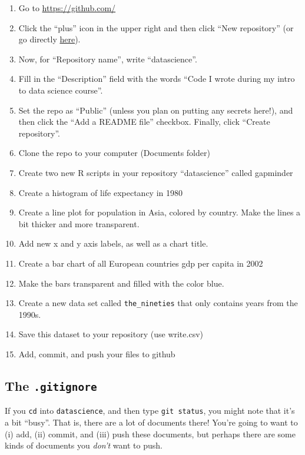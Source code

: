 \documentclass[
]{book}
\begin{document}
\begin{enumerate}
\def\labelenumi{\arabic{enumi})}
\item
  Go to \url{https://github.com/}
\item
  Click the ``plus'' icon in the upper right and then click ``New repository'' (or go directly \href{https://github.com/new}{here}).
\item
  Now, for ``Repository name'', write ``datascience''.
\item
  Fill in the ``Description'' field with the words ``Code I wrote during my intro to data science course''.
\item
  Set the repo as ``Public'' (unless you plan on putting any secrets here!), and then click the ``Add a README file'' checkbox. Finally, click ``Create repository''.
\item
  Clone the repo to your computer (Documents folder)
\item
  Create two new R scripts in your repository ``datascience'' called gapminder
\item
  Create a histogram of life expectancy in 1980
\item
  Create a line plot for population in Asia, colored by country. Make the lines a bit thicker and more transparent.
\item
  Add new x and y axis labels, as well as a chart title.
\item
  Create a bar chart of all European countries gdp per capita in 2002
\item
  Make the bars transparent and filled with the color blue.
\item
  Create a new data set called \texttt{the\_nineties} that only contains years from the 1990s.
\item
  Save this dataset to your repository (use write.csv)
\item
  Add, commit, and push your files to github
\end{enumerate}

\hypertarget{the-.gitignore}{%
\subsection*{\texorpdfstring{The \texttt{.gitignore}}{The .gitignore}}\label{the-.gitignore}}

If you \texttt{cd} into \texttt{datascience}, and then type \texttt{git\ status}, you might note that it's a bit ``busy''. That is, there are a lot of documents there! You're going to want to (i) add, (ii) commit, and (iii) push these documents, but perhaps there are some kinds of documents you \emph{don't} want to push.
\end{document}
